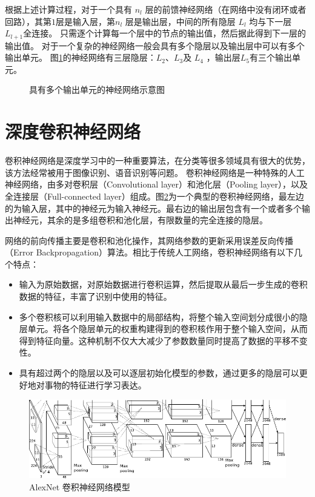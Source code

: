 根据上述计算过程，对于一个具有 $n_l$ 层的前馈神经网络（在网络中没有闭环或者回路），其第$   1 $层是输入层，第$n_l$ 层是输出层，中间的所有隐层 $L_l$ 均与下一层 $L_{l+1}$全连接。
只需逐个计算每一个层中的节点的输出值，然后据此得到下一层的输出值。
对于一个复杂的神经网络一般会具有多个隐层以及输出层中可以有多个输出单元。
图\ref{fig:network2}的神经网络有三层隐层：$  L_2 $、$ L_3$及 $ L_4$ ，输出层$  L_5 $有三个输出单元。

\begin{figure}
  \centering
  \sWuhao
  
  \caption{具有多个输出单元的神经网络示意图}
  \label{fig:network2}
\end{figure}

\section{深度卷积神经网络}
\label{sec:cnn}
卷积神经网络是深度学习中的一种重要算法，在分类等很多领域具有很大的优势，该方法经常被用于图像识别、语音识别等问题。
卷积神经网络是一种特殊的人工神经网络，由多对卷积层（Convolutional layer）和池化层（Pooling layer），以及全连接层（Full-connected layer）组成。图\ref{fig:cnn_network}为一个典型的卷积神经网络，最左边的为输入层，其中的神经元为输入神经元。最右边的输出层包含有一个或者多个输出神经元，其余的是多组卷积和池化层，有限数量的完全连接的隐层。

网络的前向传播主要是卷积和池化操作，其网络参数的更新采用误差反向传播（Error Backpropagation）算法。相比于传统人工网络，卷积神经网络有以下几个特点：
\begin{itemize}
  \item 输入为原始数据，对原始数据进行卷积运算，然后提取从最后一步生成的卷积数据的特征，丰富了识别中使用的特征。
  \item 多个卷积核可以利用输入数据中的局部结构，将整个输入空间划分成很小的隐层单元。将各个隐层单元的权重构建得到的卷积核作用于整个输入空间，从而得到特征向量。这种机制不仅大大减少了参数数量同时提高了数据的平移不变性。
  \item 具有超过两个的隐层以及可以逐层初始化模型的参数，通过更多的隐层可以更好地对事物的特征进行学习表达。
\end{itemize}

\begin{figure}
  \centering
  \includegraphics[width=13.5cm]{figures/networks/alexnetarchitecture}
  \caption{ AlexNet 卷积神经网络模型}
  \label{fig:cnn_network}
\end{figure}

